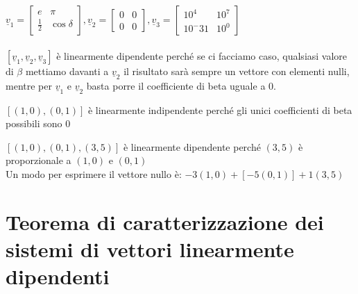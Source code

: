   \begin{es}
    $\underline{v}_1=
    \begin{bmatrix}
      e           & \pi\\
      \frac{1}{2} & \cos \delta
    \end{bmatrix}, \underline{v}_2=
    \begin{bmatrix}
      0 & 0\\
      0 & 0
    \end{bmatrix}, \underline{v}_3=
    \begin{bmatrix}
      10^4   & 10^7\\
      10^-31 & 10^0
    \end{bmatrix}$\\\\
    $[\underline{v}_1,\underline{v}_2,\underline{v}_3]$ è linearmente
    dipendente perché se ci facciamo caso, qualsiasi valore di
    $\beta$ mettiamo davanti a $\underline{v}_2$ il risultato sarà
    sempre un vettore con elementi nulli, mentre per
    $\underline{v}_1$ e $\underline{v}_2$ basta porre il coefficiente
    di beta uguale a 0.
  \end{es}

  \begin{es}
    $[(1,0),(0,1)]$ è linearmente indipendente perché gli unici
    coefficienti di beta possibili sono 0
  \end{es}

  \begin{es}
    $[(1,0),(0,1),(3,5)]$ è linearmente dipendente perché $(3,5)$ è
    proporzionale a $(1,0)$ e $(0,1)$\\
    Un modo per esprimere il vettore nullo è: $-3(1,0)+[-5(0,1)]+1(3,5)$
  \end{es}

  \section{Teorema di caratterizzazione dei sistemi di vettori
  linearmente dipendenti}

